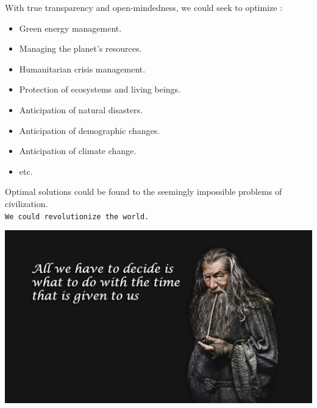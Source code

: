 With true transparency and open-mindedness, we could seek to optimize :\\

\begin{itemize}
\item Green energy management.
\item Managing the planet's resources.
\item Humanitarian crisis management.
\item Protection of ecosystems and living beings.
\item Anticipation of natural disasters.
\item Anticipation of demographic changes.
\item Anticipation of climate change.
\item etc.\\
\end{itemize}

Optimal solutions could be found to the seemingly impossible problems of civilization.\\

\texttt{\Large \comfortaa We could revolutionize the world.}

\vspace{1cm}

\begin{center}
\includegraphics[scale=0.22]{Media/GandalfQuote.jpg}
\end{center}